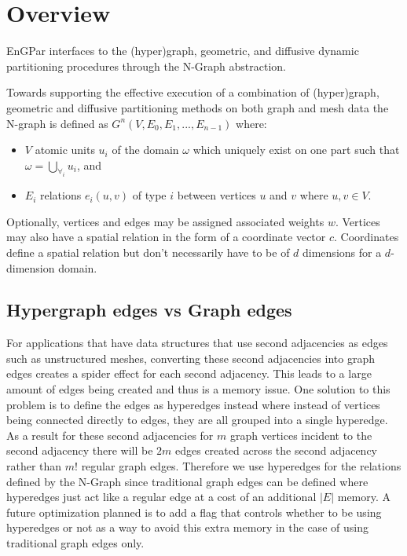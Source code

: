 \documentclass[12pt]{article}
\begin{document}
\maketitle

\section{Overview} \label{overview}
EnGPar interfaces to the (hyper)graph, geometric, and diffusive dynamic
partitioning procedures through the N-Graph abstraction.

Towards supporting the effective execution of a combination of (hyper)graph,
geometric and diffusive partitioning methods on both graph and mesh data the
N-graph is defined as $G^n(V,E_0,E_1,...,E_{n-1})$ where:
\begin{itemize}
  \item $V$ atomic units $u_i$ of the domain $\omega$ which uniquely exist on one
    part such that $\omega = \bigcup_{\forall_i}u_i$, and 
  \item $E_i$ relations $e_i(u,v)$ of type $i$ between vertices $u$ and $v$
    where $u,v \in V$.
\end{itemize}
Optionally, vertices and edges may be assigned associated weights $w$.  
Vertices may also have a spatial relation in the form of a coordinate vector $c$.
Coordinates define a spatial relation but don't necessarily have to be of $d$
dimensions for a $d$-dimension domain.

\subsection{Hypergraph edges vs Graph edges}
For applications that have data structures that use second adjacencies as edges such as unstructured meshes, converting these second adjacencies into graph edges creates a spider effect for each second adjacency. This leads to a large amount of edges being created and thus is a memory issue. One solution to this problem is to define the edges as hyperedges instead where instead of vertices being connected directly to edges, they are all grouped into a single hyperedge. As a result for these second adjacencies for $m$ graph vertices incident to the second adjacency there will be $2m$ edges created across the second adjacency rather than $m!$ regular graph edges. Therefore we use hyperedges for the relations defined by the N-Graph since traditional graph edges can be defined where hyperedges just act like a regular edge at a cost of an additional $|E|$ memory. A future optimization planned is to add a flag that controls whether to be using hyperedges or not as a way to avoid this extra memory in the case of using traditional graph edges only.
\end{document}
